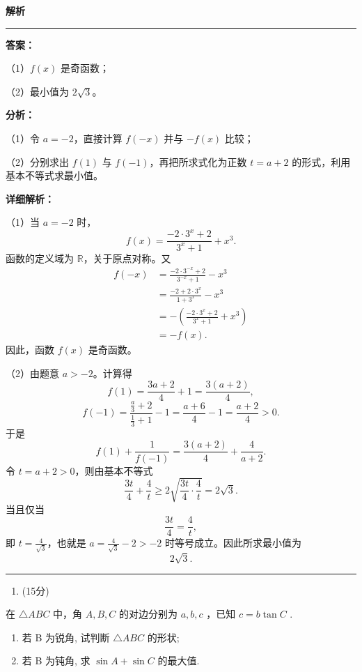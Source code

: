 \documentclass[UTF8,12pt,a4paper]{ctexart}
\renewcommand{\labelenumi}{\arabic{enumi}.}
\newenvironment{examSolutionBox}{%
  \par\medskip\begingroup
  \setlength{\leftskip}{1.0em}\setlength{\rightskip}{0.9em}%
  \noindent\textcolor{SolutionTeal}{\bfseries\large 解析}\par
  \smallskip\noindent\textcolor{SolutionRule}{\rule{\dimexpr\linewidth-\leftskip-\rightskip\relax}{0.8pt}}\par
  \smallskip\color{SolutionInk}%
}{%
  \par\smallskip\noindent\textcolor{SolutionRule}{\rule{\dimexpr\linewidth-\leftskip-\rightskip\relax}{0.8pt}}\par
  \endgroup\medskip
}
\providecommand{\tightlist}{%
  \setlength{\itemsep}{0pt}\setlength{\parskip}{0pt}}
\begin{document}
\begin{examSolutionBox}

\textbf{答案：}
\par\smallskip\noindent（1）\(f(x)\) 是奇函数；
\par\smallskip\noindent（2）最小值为 \(2\sqrt3\)。

\textbf{分析：}
\par\smallskip\noindent（1）令 \(a=-2\)，直接计算 \(f(-x)\) 并与 \(-f(x)\) 比较；
\par\smallskip\noindent（2）分别求出 \(f(1)\) 与 \(f(-1)\)，再把所求式化为正数 \(t=a+2\) 的形式，利用基本不等式求最小值。

\textbf{详细解析：}


\par\smallskip\noindent（1）当 \(a=-2\) 时，
\[
   f(x)=\frac{-2\cdot 3^x+2}{3^x+1}+x^3.
   \]
函数的定义域为 \(\mathbb R\)，关于原点对称。又
\[
   \begin{aligned}
   f(-x)
   &=\frac{-2\cdot 3^{-x}+2}{3^{-x}+1}-x^3\\
   &=\frac{-2+2\cdot 3^x}{1+3^x}-x^3\\
   &=-\left(\frac{-2\cdot 3^x+2}{3^x+1}+x^3\right)\\
   &=-f(x).
   \end{aligned}
   \]
因此，函数 \(f(x)\) 是奇函数。


\par\smallskip\noindent（2）由题意 \(a>-2\)。计算得
\[
   f(1)=\frac{3a+2}{4}+1=\frac{3(a+2)}4,
   \]
\[
   f(-1)=\frac{\frac a3+2}{\frac13+1}-1
   =\frac{a+6}{4}-1
   =\frac{a+2}{4}>0.
   \]
于是
\[
   f(1)+\frac1{f(-1)}
   =\frac{3(a+2)}4+\frac4{a+2}.
   \]
令 \(t=a+2>0\)，则由基本不等式
\[
   \frac{3t}{4}+\frac4t
   \geqslant 2\sqrt{\frac{3t}{4}\cdot\frac4t}
   =2\sqrt3.
   \]
当且仅当
\[
   \frac{3t}{4}=\frac4t,
   \]
即 \(t=\frac4{\sqrt3}\)，也就是 \(a=\frac4{\sqrt3}-2>-2\) 时等号成立。因此所求最小值为
\[
   \boxed{2\sqrt3}.
   \]

\end{examSolutionBox}

\begin{enumerate}
\def\labelenumi{\arabic{enumi}.}
\setcounter{enumi}{16}
\tightlist
\item
  (15分)
\end{enumerate}

在 \(\triangle ABC\) 中，角 \(A, B, C\) 的对边分别为 \(a, b, c\) ，已知 \(c = b\tan C\) .

\begin{enumerate}
\def\labelenumi{(\arabic{enumi})}
\item
  若 B 为锐角, 试判断 \(\triangle ABC\) 的形状;
\item
  若 B 为钝角, 求 \(\sin A + \sin C\) 的最大值.
\end{enumerate}
\end{document}
